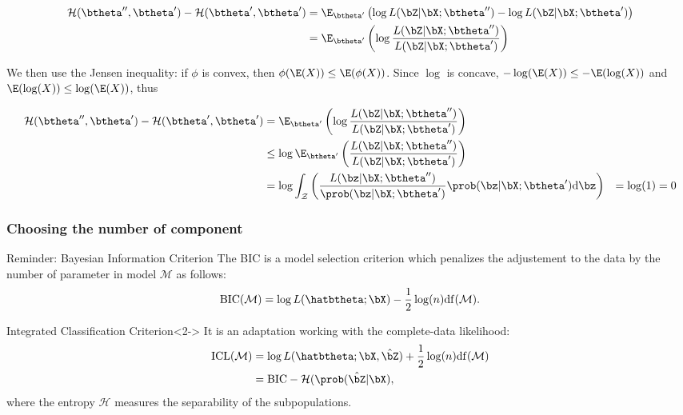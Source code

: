 \documentclass{beamer}\usepackage[]{graphicx}\usepackage[]{color}
\begin{document}
\begin{frame}[allowframebreaks]
    \newpage
    
    \begin{align*}
    \mathcal{H}(\btheta'',\btheta') - \mathcal{H}(\btheta',\btheta') & = 
    \E_{\btheta'}\left( \log L(\bZ | \bX; \btheta'') - \log L(\bZ | \bX; \btheta')\right)  \\
      & = \E_{\btheta'} \left( \log \frac{L(\bZ | \bX; \btheta'')}{L(\bZ | \bX; \btheta')} \right)
    \end{align*}
    
    We then use the Jensen inequality: if $\phi$ is convex, then $ \phi(\E(X)) \leq \E(\phi(X))$. Since $\log$ is concave, 
    $-\log(\E(X)) \leq -\E(\log(X))$ and $ \E(\log(X)) \leq \log(\E(X))$, thus
    
    \begin{align*}
    \mathcal{H}(\btheta'',\btheta') - \mathcal{H}(\btheta',\btheta') & = 
    \E_{\btheta'} \left( \log \frac{L(\bZ | \bX; \btheta'')}{L(\bZ | \bX; \btheta')} \right) \\
      & \leq \log \E_{\btheta'}\left(\frac{L(\bZ | \bX; \btheta'')}{L(\bZ | \bX; \btheta')} \right)\\
      & = \log \int_{\mathcal{Z}} \left(\frac{L(\bz | \bX; \btheta'')}{\prob(\bz | \bX; \btheta')} \prob(\bz | \bX; \btheta')  \mathrm{d} \bz\right)
      & = \log(1) = 0
    \end{align*}

\end{frame}

\begin{frame}
  \frametitle{Choosing the number of component}

  \begin{block}{Reminder: Bayesian Information Criterion}
    The BIC is a model selection criterion which penalizes the adjustement to the data by the number of parameter in model $\mathcal{M}$ as follows:
    \begin{equation*}
      \mathrm{BIC}(\mathcal{M}) = \log L(\hatbtheta; \bX) - \frac{1}{2}\log(n) \mathrm{df}(\mathcal{M}).
    \end{equation*}
  \end{block}

  \vspace{-.35cm}

  \begin{block}{Integrated Classification Criterion}<2->
    It is an adaptation working with the complete-data likelihood:
    \vspace{-.25cm}
    \begin{align*}
      \mathrm{ICL}(\mathcal{M}) & = \log L(\hatbtheta; \bX, \hat{\bZ}) + \frac{1}{2}\log(n) \mathrm{df}(\mathcal{M}) \\
      & = \mathrm{BIC} - \mathcal{H}(\prob(\hat \bZ | \bX),
    \end{align*}
    where the entropy $\mathcal{H}$ measures the separability of the subpopulations.
  \end{block}

  \vfill

\end{frame}
\end{document}
